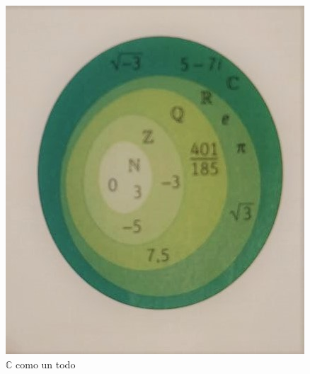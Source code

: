 \documentclass[../main.tex]{memoir}
\begin{document}
\begin{figure}[H]
	\centering
	\includegraphics[scale=0.3]{images/complex.jpg}
	\caption{$\mathbb{C}$ como un todo}
	\label{representacion1}
\end{figure}
\end{document}
